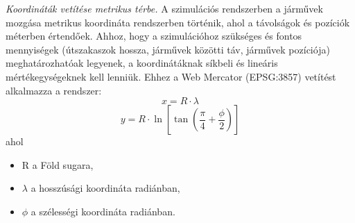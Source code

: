 \documentclass[14pt,a4paper]{extarticle}
\begin{document}
\textit{Koordináták vetítése metrikus térbe.} A szimulációs rendszerben a járművek mozgása metrikus koordináta rendszerben történik, ahol a távolságok és pozíciók méterben értendőek. Ahhoz, hogy a szimulációhoz szükséges és fontos mennyiségek (útszakaszok hossza, járművek közötti táv, járművek pozíciója) meghatározhatóak legyenek, a koordinátáknak síkbeli és lineáris mértékegységeknek kell lenniük. Ehhez a Web Mercator (EPSG:3857) vetítést alkalmazza a rendszer:
$$x = R \cdot \lambda$$$$y = R \cdot \ln \left[ \tan \left( \frac{\pi}{4} + \frac{\phi}{2} \right) \right]$$
ahol
\begin{itemize}
    \item R a Föld sugara,
    \item $\lambda$ a hosszúsági koordináta radiánban,
    \item $\phi$ a szélességi koordináta radiánban.
\end{itemize}
\end{document}
